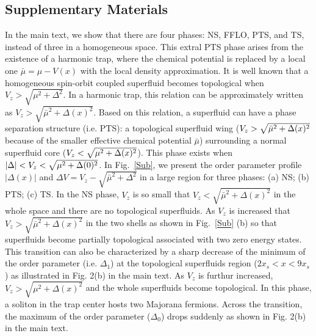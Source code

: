 \documentclass[prl,aps,twocolumn,showpacs, floatfix]{revtex4}
\begin{document}
\begin{widetext}
\section{Supplementary Materials}
In the main text, we show that there are four phases: NS, FFLO, PTS, and TS,
instead of three in a homogeneous space. This extral PTS phase arises from
the existence of a harmonic trap, where the chemical potential is replaced
by a local one $\bar{\mu}=\mu -V(x)$ with the local density approximation.
It is well known that a homogeneous spin-orbit coupled superfluid becomes
topological when $V_{z}>\sqrt{\mu ^{2}+\Delta ^{2}}$. In a harmonic trap,
this relation can be approximately written as $V_{z}>\sqrt{\bar{\mu}%
^{2}+\Delta (x)^{2}}$. Based on this relation, a superfluid can have a phase
separation structure (i.e. PTS): a topological superfluid wing ($V_{z}>\sqrt{%
\bar{\mu}^{2}+\Delta (x)^{2}}$ because of the smaller effective chemical
potential $\bar{\mu}$) surrounding a normal superfluid core ($V_{z}<\sqrt{%
\mu ^{2}+\Delta (x)^{2}}$). This phase exists when $|\Delta |<V_{z}<\sqrt{%
\mu ^{2}+\Delta (0)^{2}}$. In Fig.~\ref{Sub}, we present the order parameter
profile $|\Delta (x)|$ and $\Delta V=V_{z}-\sqrt{\bar{\mu}^{2}+\Delta ^{2}}$
in a large region for three phases: (a) NS; (b) PTS; (c) TS. In the NS
phase, $V_{z}$ is so small that $V_{z}<\sqrt{\bar{\mu}^{2}+\Delta (x)^{2}}$
in the whole space and there are no topological superfluids. As $V_{z}$ is
increased that $V_{z}>\sqrt{\bar{\mu}^{2}+\Delta (x)^{2}}$ in the two shells
as shown in Fig.~\ref{Sub} (b) so that superfluids become partially
topological associated with two zero energy states. This transition can also
be characterized by a sharp decrease of the minimum of the order parameter
(i.e. $\Delta _{1}$) at the topological superfluids region ($2x_{s}<x<9x_{s}$%
) as illustrated in Fig. 2(b) in the main text. As $V_{z}$ is furthur
increased, $V_{z}>\sqrt{\mu ^{2}+\Delta (x)^{2}}$ and the whole superfluids
become topological. In this phase, a soliton in the trap center hosts two
Majorana fermions. Across the transition, the maximum of the order parameter
($\Delta _{0}$) drops suddenly as shown in Fig. 2(b) in the main text.


\end{widetext}
\end{document}

